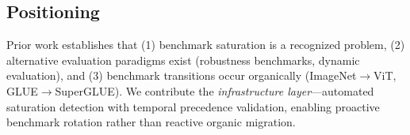 \subsection{Positioning}

Prior work establishes that (1) benchmark saturation is a recognized problem, (2) alternative evaluation paradigms exist (robustness benchmarks, dynamic evaluation), and (3) benchmark transitions occur organically (ImageNet$\rightarrow$ViT, GLUE$\rightarrow$SuperGLUE). We contribute the \emph{infrastructure layer}---automated saturation detection with temporal precedence validation, enabling proactive benchmark rotation rather than reactive organic migration.
